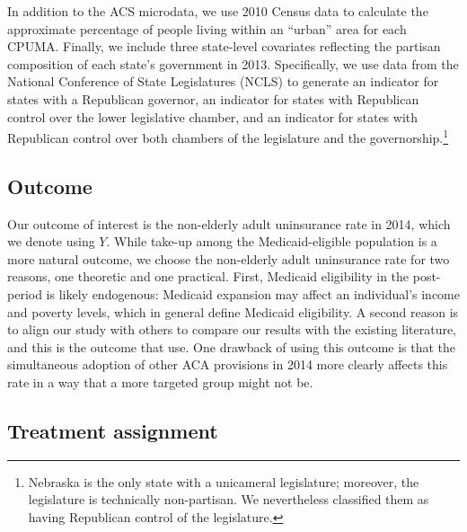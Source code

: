 \documentclass[aoas]{imsart}
\theoremstyle{plain}
\theoremstyle{remark}
\begin{document}
In addition to the ACS microdata, we use 2010 Census data to calculate the approximate percentage of people living within an ``urban'' area for each CPUMA. Finally, we include three state-level covariates reflecting the partisan composition of each state's government in 2013. Specifically, we use data from the National Conference of State Legislatures (NCLS) to generate an indicator for states with a Republican governor, an indicator for states with Republican control over the lower legislative chamber, and an indicator for states with Republican control over both chambers of the legislature and the governorship.\footnote{Nebraska is the only state with a unicameral legislature; moreover, the legislature is technically non-partisan. We nevertheless classified them as having Republican control of the legislature.} 

\subsection{Outcome}

Our outcome of interest is the non-elderly adult uninsurance rate in 2014, which we denote using $Y$. While take-up among the Medicaid-eligible population is a more natural outcome, we choose the non-elderly adult uninsurance rate for two reasons, one theoretic and one practical. First, Medicaid eligibility in the post-period is likely endogenous: Medicaid expansion may affect an individual's income and poverty levels, which in general define Medicaid eligibility. A second reason is to align our study with others to compare our results with the existing literature, and this is the outcome that \cite{courtemanche2017early} use. One drawback of using this outcome is that the simultaneous adoption of other ACA provisions in 2014 more clearly affects this rate in a way that a more targeted group might not be.

\subsection{Treatment assignment} \label{sssec:txassign}
\end{document}

